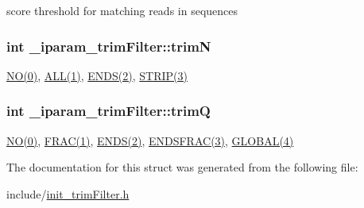 score threshold for matching reads in sequences \hypertarget{struct__iparam__trimFilter_a5f2d247cc26608ed5cc9e2d6943940d7}{
\subsubsection[{trim\+N}]{\setlength{\rightskip}{0pt plus 5cm}int \+\_\+iparam\+\_\+trim\+Filter\+::trim\+N}}\label{struct__iparam__trimFilter_a5f2d247cc26608ed5cc9e2d6943940d7}
\hyperlink{defines_8h_a996bde01ecac342918f0a2c4e7ce7bd5}{N\+O(0)}, \hyperlink{defines_8h_a1edd1ea8bddaf4d9c5eb3eae1ee1726a}{A\+L\+L(1)}, \hyperlink{defines_8h_a052e72209cfac2ff9aa78294f0bebea8}{E\+N\+D\+S(2)}, \hyperlink{defines_8h_a53529d9638a1d70f6e5989dedf4c2672}{S\+T\+R\+I\+P(3)} \hypertarget{struct__iparam__trimFilter_a5b5344041c9313230de07c9485227203}{
\subsubsection[{trim\+Q}]{\setlength{\rightskip}{0pt plus 5cm}int \+\_\+iparam\+\_\+trim\+Filter\+::trim\+Q}}\label{struct__iparam__trimFilter_a5b5344041c9313230de07c9485227203}
\hyperlink{defines_8h_a996bde01ecac342918f0a2c4e7ce7bd5}{N\+O(0)}, \hyperlink{defines_8h_a653af6bd29f56a2699de26a928820da7}{F\+R\+A\+C(1)}, \hyperlink{defines_8h_a052e72209cfac2ff9aa78294f0bebea8}{E\+N\+D\+S(2)}, \hyperlink{defines_8h_abf0b71573c7ffc4f6746c24c9abc202a}{E\+N\+D\+S\+F\+R\+A\+C(3)}, \hyperlink{defines_8h_a3de33738fd3c7e77bffbcfaefc3e7645}{G\+L\+O\+B\+A\+L(4)} 

The documentation for this struct was generated from the following file\+:\begin{DoxyCompactItemize}
\item 
include/\hyperlink{init__trimFilter_8h}{init\+\_\+trim\+Filter.\+h}\end{DoxyCompactItemize}
